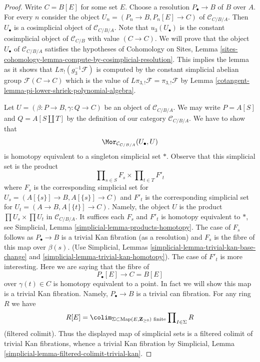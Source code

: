 \begin{proof}

Write $C = B[E]$ for some set $E$. Choose a resolution
$P_\bullet \to B$ of $B$ over $A$. For every $n$ consider
the object $U_n = (P_n \to B, P_n[E] \to C)$ of $\mathcal{C}_{C/B/A}$.
Then $U_\bullet$ is a cosimplicial object of $\mathcal{C}_{C/B/A}$.
Note that $u_3(U_\bullet)$ is the constant cosimplicial
object of $\mathcal{C}_{C/B}$ with value $(C \to C)$.
We will prove that the object $U_\bullet$ of $\mathcal{C}_{C/B/A}$
satisfies the hypotheses of
Cohomology on Sites, Lemma
\ref{sites-cohomology-lemma-compute-by-cosimplicial-resolution}.
This implies the lemma as it shows that $L\pi_!(g_3^{-1}\mathcal{F})$
is computed by the constant simplicial abelian group
$\mathcal{F}(C \to C)$ which is the value of
$L\pi_{3, !}\mathcal{F} = \pi_{3, !}\mathcal{F}$ by
Lemma \ref{cotangent-lemma-pi-lower-shriek-polynomial-algebra}.

\medskip\noindent
Let $U = (\beta : P \to B, \gamma : Q \to C)$ be an object of
$\mathcal{C}_{C/B/A}$. We may write $P = A[S]$ and $Q = A[S \amalg T]$
by the definition of our category $\mathcal{C}_{C/B/A}$. We have to show that
$$
\Mor_{\mathcal{C}_{C/B/A}}(U_\bullet, U)
$$
is homotopy equivalent to a singleton simplicial set $*$. Observe that this
simplicial set is the product
$$
\prod\nolimits_{s \in S} F_s \times \prod\nolimits_{t \in T} F'_t
$$
where $F_s$ is the corresponding simplicial set for
$U_s = (A[\{s\}] \to B, A[\{s\}] \to C)$
and $F'_t$ is the corresponding simplicial set for
$U_t = (A \to B, A[\{t\}] \to C)$. Namely, the object $U$
is the product $\prod U_s \times \prod U_t$ in $\mathcal{C}_{C/B/A}$.
It suffices each $F_s$ and $F'_t$ is homotopy equivalent to $*$, see
Simplicial, Lemma \ref{simplicial-lemma-products-homotopy}.
The case of $F_s$ follows as $P_\bullet \to B$ is a trivial Kan
fibration (as a resolution) and $F_s$ is the fibre of this map over
$\beta(s)$. (Use Simplicial, Lemmas
\ref{simplicial-lemma-trivial-kan-base-change} and
\ref{simplicial-lemma-trivial-kan-homotopy}).
The case of $F'_t$ is more interesting. Here we are saying that
the fibre of
$$
P_\bullet[E] \longrightarrow C = B[E]
$$
over $\gamma(t) \in C$ is homotopy equivalent to a point. In fact we
will show this map is a trivial Kan fibration. Namely,
$P_\bullet \to B$ is a trivial can fibration. For any ring $R$
we have
$$
R[E] =
\colim_{\Sigma \subset \text{Map}(E, \mathbf{Z}_{\geq 0})\text{ finite}}
\prod\nolimits_{I \in \Sigma} R
$$
(filtered colimit). Thus the displayed map of simplicial sets is a
filtered colimit of trivial Kan fibrations, whence a trivial Kan fibration
by Simplicial, Lemma \ref{simplicial-lemma-filtered-colimit-trivial-kan}.
\end{proof}

